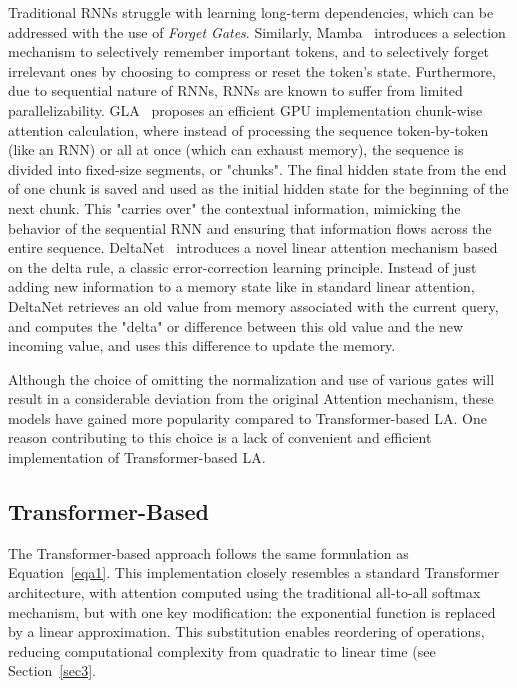 \par Traditional RNNs struggle with learning long-term dependencies, which can be addressed with the use of \textit{Forget Gates}. Similarly, Mamba~\cite{gu2023mamba} introduces a selection mechanism to selectively remember important tokens, and to selectively forget irrelevant ones by choosing to compress or reset the token's state. Furthermore, due to sequential nature of RNNs, RNNs are known to suffer from limited parallelizability. GLA~\cite{yang2023gated} proposes an efficient GPU implementation chunk-wise attention calculation, where instead of processing the sequence token-by-token (like an RNN) or all at once (which can exhaust memory), the sequence is divided into fixed-size segments, or "chunks". The final hidden state from the end of one chunk is saved and used as the initial hidden state for the beginning of the next chunk. This "carries over" the contextual information, mimicking the behavior of the sequential RNN and ensuring that information flows across the entire sequence. DeltaNet~\cite{schlag2021linear} introduces a novel linear attention mechanism based on the delta rule, a classic error-correction learning principle. Instead of just adding new information to a memory state like in standard linear attention, DeltaNet retrieves an old value from memory associated with the current query, and computes the "delta" or difference between this old value and the new incoming value, and uses this difference to update the memory.

\par Although the choice of omitting the normalization and use of various gates will result in a considerable deviation from the original Attention mechanism, these models have gained more popularity compared to Transformer-based LA. One reason contributing to this choice is a lack of convenient and efficient implementation of Transformer-based LA.

\subsection{Transformer-Based}
The Transformer-based approach follows the same formulation as Equation~\ref{eqa1}. This implementation closely resembles a standard Transformer architecture, with attention computed using the traditional all-to-all softmax mechanism, but with one key modification: the exponential function is replaced by a linear approximation. This substitution enables reordering of operations, reducing computational complexity from quadratic to linear time (see Section~\ref{sec3}.

